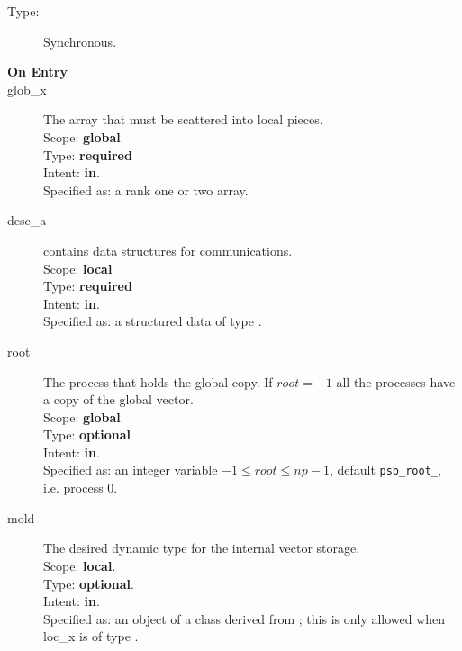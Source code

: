 \begin{description}
\item[Type:] Synchronous.
\item[\bf On Entry]
\item[glob\_x] The array that must be scattered into local pieces.\\
Scope: {\bf global} \\
Type: {\bf required}\\
Intent: {\bf in}.\\
Specified as: a rank one or two array.
\item[desc\_a] contains data structures for communications.\\
Scope: {\bf local} \\
Type: {\bf required}\\
Intent: {\bf in}.\\
Specified as: a structured data of type \descdata.
\item[root]  The process that holds the global copy. If $root=-1$ all
  the processes have a copy of the global vector.\\
Scope: {\bf global} \\
Type: {\bf optional}\\
Intent: {\bf in}.\\
Specified as: an integer variable $-1\le root\le np-1$, default
\verb|psb_root_|, i.e. process 0. 
\item[mold] The desired dynamic type for the internal vector storage.\\
Scope: {\bf local}.\\
Type: {\bf optional}.\\
Intent: {\bf in}.\\
Specified as: an object of a class derived from \vbasedata; this is
only allowed when loc\_x is of type \vdata.

\end{description}
